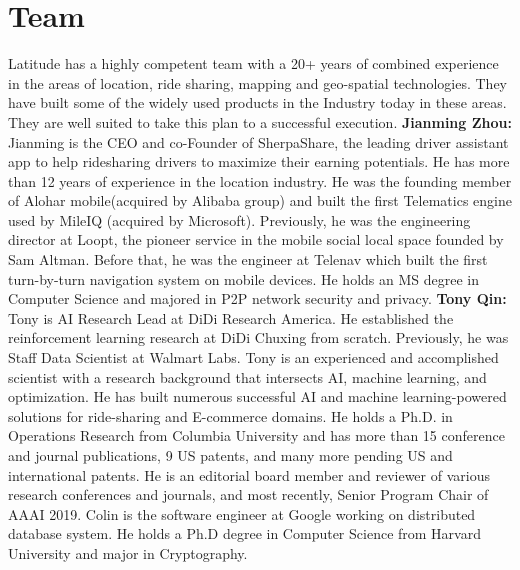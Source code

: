 \section{Team}

Latitude has a highly competent team with a 20+ years of combined experience in the areas of location, ride sharing, mapping and
geo-spatial technologies. They have built some of the widely used products in the Industry today in these areas. They are well suited to take this plan to a successful execution.
\newline
\newline
\noindent
{\bf Jianming Zhou:}
Jianming is the CEO and co-Founder of SherpaShare, the leading driver assistant app to help ridesharing drivers to
maximize their earning potentials. He has more than 12 years of experience in the location industry. He was the founding
member of Alohar mobile(acquired by Alibaba group) and built the first Telematics engine used by MileIQ (acquired by
Microsoft). Previously, he was the engineering director at Loopt, the pioneer service in the mobile social local space
founded by Sam Altman. Before that, he was the engineer at Telenav which built the first turn-by-turn navigation system
on mobile devices. He holds an MS degree in Computer Science and majored in P2P network security and privacy.
\newline
\newline
\noindent
{\bf Tony Qin:}
Tony is AI Research Lead at DiDi Research America.  He established the reinforcement learning research at DiDi Chuxing
from scratch.  Previously, he was Staff Data Scientist at Walmart Labs.  Tony is an experienced and accomplished
scientist with a research background that intersects AI, machine learning, and optimization.  He has built numerous
successful AI and machine learning-powered solutions for ride-sharing and E-commerce domains.  He holds a Ph.D. in
Operations Research from Columbia University and has more than 15 conference and journal publications, 9 US patents, and
many more pending US and international patents.  He is an editorial board member and reviewer of various research
conferences and journals, and most recently, Senior Program Chair of AAAI 2019.
\newline
\newline
{}
Colin is the software engineer at Google working on distributed database system. He
holds a Ph.D degree in Computer Science from Harvard University and major in Cryptography.
\newline
